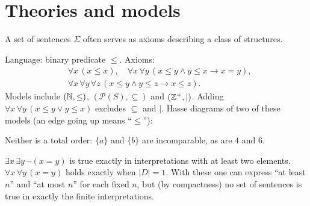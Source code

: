 \section{Theories and models}

A set of sentences $\Sigma$ often serves as axioms describing a class of structures.

\begin{example}
Language: binary predicate $\le$. Axioms:
\begin{align*}
&\forall x\,(x\le x), \quad
 \forall x\,\forall y\,(x\le y\land y\le x\to x=y),\\
&\forall x\,\forall y\,\forall z\,(x\le y\land y\le z\to x\le z).
\end{align*}
Models include $(\mathbb{N},\le)$, $(\mathcal{P}(S),\subseteq)$ and $(\mathbb{Z}^+,\mid)$. Adding
$\forall x\,\forall y\,(x\le y\lor y\le x)$ excludes $\subseteq$ and $\mid$.
Hasse diagrams of two of these models (an edge going up means ``$\le$''):
\begin{center}

\small Neither is a total order: $\{a\}$ and $\{b\}$ are incomparable, as are $4$ and $6$.
\end{center}
\end{example}

\begin{example}
$\exists x\,\exists y\,\neg(x=y)$ is true exactly in interpretations with at least two
elements. $\forall x\,\forall y\,(x=y)$ holds exactly when $|D|=1$. With these one can
express ``at least $n$'' and ``at most $n$'' for each fixed $n$, but (by compactness)
no set of sentences is true in exactly the finite interpretations.
\end{example}

